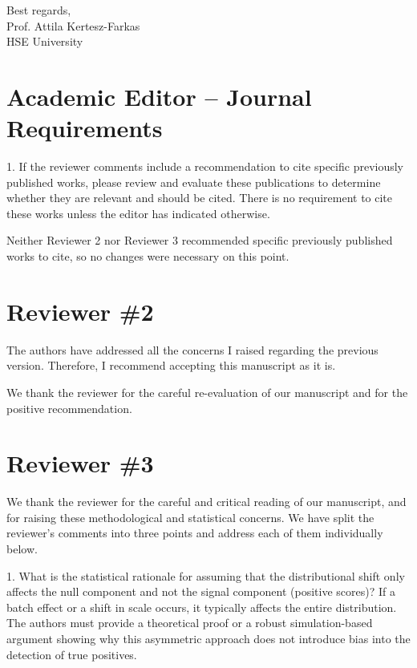 \documentclass{article}
\newcommand{\response}[1]{\vspace*{1ex} \color{blue} \noindent #1 \color{black}
\vspace*{2ex}}
\begin{document}
\noindent
Best regards,\\[2ex]

\noindent
Prof. Attila Kertesz-Farkas\\
HSE University

\clearpage
\section*{Academic Editor -- Journal Requirements}

1. If the reviewer comments include a recommendation to cite specific previously published works, please review and evaluate these publications to determine whether they are relevant and should be cited. There is no requirement to cite these works unless the editor has indicated otherwise.

\response{Neither Reviewer 2 nor Reviewer 3 recommended specific previously published works to cite, so no changes were necessary on this point.}

\clearpage
\section*{Reviewer \#2}

The authors have addressed all the concerns I raised regarding the previous version. Therefore, I recommend accepting this manuscript as it is.

\response{We thank the reviewer for the careful re-evaluation of our manuscript and for the positive recommendation.}

\clearpage
\section*{Reviewer \#3}

\response{We thank the reviewer for the careful and critical reading of our manuscript, and for raising these methodological and statistical concerns. We have split the reviewer's comments into three points and address each of them individually below.}

1. What is the statistical rationale for assuming that the distributional shift only affects the null component and not the signal component (positive scores)? If a batch effect or a shift in scale occurs, it typically affects the entire distribution. The authors must provide a theoretical proof or a robust simulation-based argument showing why this asymmetric approach does not introduce bias into the detection of true positives.
\end{document}
